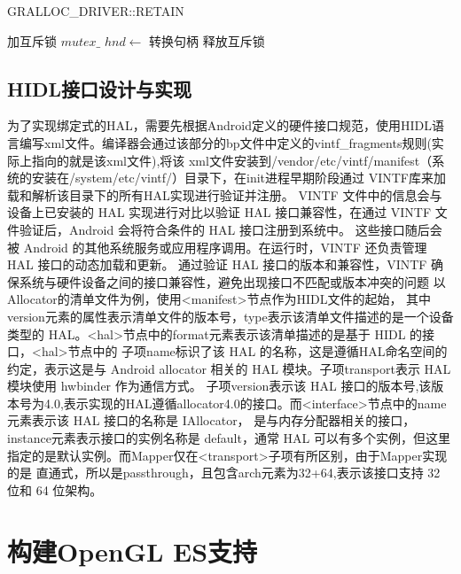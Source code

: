\begin{algorithm}
\caption{GRALLOC\_DRIVER::RETAIN}
\label{algo:RETAIN}
\SetAlgoLined
{}
\BlankLine
加互斥锁 $mutex\_$\;
$hnd \leftarrow$ 转换句柄\;
释放互斥锁\;
\end{algorithm}

\subsection{HIDL接口设计与实现}
为了实现绑定式的HAL，需要先根据Android定义的硬件接口规范，使用HIDL语言编写xml文件。编译器会通过该部分的bp文件中定义的vintf\_fragments规则(实际上指向的就是该xml文件),将该
xml文件安装到/vendor/etc/vintf/manifest（系统的安装在/system/etc/vintf/）目录下，在init进程早期阶段通过 VINTF库来加载和解析该目录下的所有HAL实现进行验证并注册。
VINTF 文件中的信息会与设备上已安装的 HAL 实现进行对比以验证 HAL 接口兼容性，在通过 VINTF 文件验证后，Android 会将符合条件的 HAL 接口注册到系统中。
这些接口随后会被 Android 的其他系统服务或应用程序调用。在运行时，VINTF 还负责管理 HAL 接口的动态加载和更新。
通过验证 HAL 接口的版本和兼容性，VINTF 确保系统与硬件设备之间的接口兼容性，避免出现接口不匹配或版本冲突的问题
以Allocator的清单文件为例，使用<manifest>节点作为HIDL文件的起始，
其中version元素的属性表示清单文件的版本号，type表示该清单文件描述的是一个设备类型的 HAL。<hal>节点中的format元素表示该清单描述的是基于 HIDL 的接口，<hal>节点中的
子项name标识了该 HAL 的名称，这是遵循HAL命名空间的约定，表示这是与 Android allocator 相关的 HAL 模块。子项transport表示 HAL 模块使用 hwbinder 作为通信方式。
子项version表示该 HAL 接口的版本号,该版本号为4.0,表示实现的HAL遵循allocator4.0的接口。而<interface>节点中的name元素表示该 HAL 接口的名称是 IAllocator，
是与内存分配器相关的接口，instance元素表示接口的实例名称是 default，通常 HAL 可以有多个实例，但这里指定的是默认实例。而Mapper仅在<transport>子项有所区别，由于Mapper实现的是
直通式，所以是passthrough，且包含arch元素为32+64,表示该接口支持 32 位和 64 位架构。

\section{构建OpenGL ES支持}

